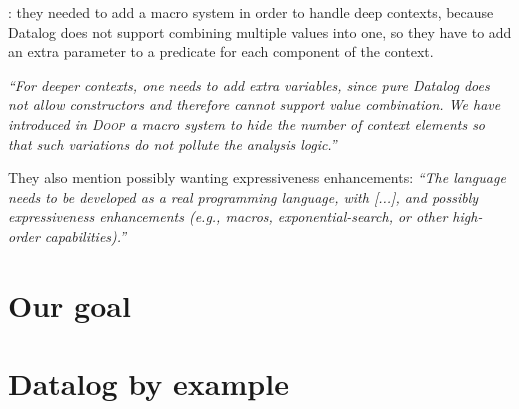 
\cite{DBLP:conf/datalog/SmaragdakisB10}: they needed to add a macro system in
order to handle deep contexts, because Datalog does not support combining
multiple values into one, so they have to add an extra parameter to a predicate
for each component of the context.

\emph{``For deeper contexts, one needs to add extra variables, since pure
  Datalog does not allow constructors and therefore cannot support value
  combination. We have introduced in \textsc{Doop} a macro system to hide the
  number of context elements so that such variations do not pollute the analysis
  logic.''}

They also mention possibly wanting expressiveness enhancements: \emph{``The
  language needs to be developed as a real programming language, with [...], and
  possibly expressiveness enhancements (e.g., macros, exponential-search, or
  other high-order capabilities).''}


\section{Our goal}



\section{Datalog by example}



